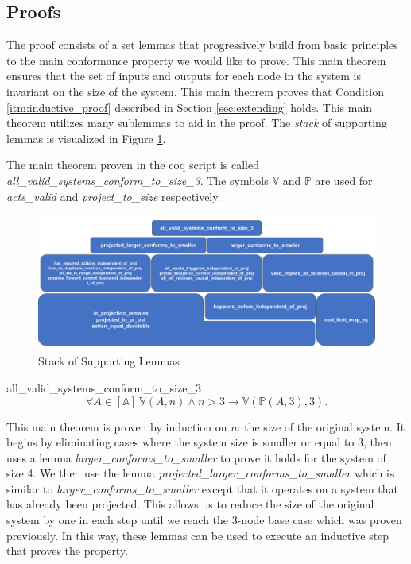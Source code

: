 \documentclass[runningheads]{llncs}
\newcommand{\action}{\mathds{A}}
\newcommand{\listaction}{[\action]}
\newcommand{\actsvalid}[2]{\mathds{V}(#1, #2)}
\newcommand{\projectsize}[2]{\mathds{P}(#1, #2)}
\begin{document}
\subsection{Proofs}

The proof consists of a set lemmas that progressively build from basic principles to the main conformance property we would like to prove. This main theorem ensures that the set of inputs and outputs for each node in the system is invariant on the size of the system. 
This main theorem proves that Condition \ref{itm:inductive_proof} described in Section \ref{sec:extending} holds. This main theorem utilizes many sublemmas to aid in the proof.
The \emph{stack} of supporting lemmas is visualized in Figure \ref{fig:coqLemmaStack}.


The main theorem proven in the coq script is called \sloppy \emph{all\_valid\_systems\_conform\_to\_size\_3}. 
The symbols $\mathds{V}$ and $\mathds{P}$ are used for \emph{acts\_valid} and \emph{project\_to\_size} respectively. 

\begin{figure}[h]
    \centering
    \includegraphics[scale=0.35]{CoqLemmaStack.png}
    \caption{Stack of Supporting Lemmas}
    \label{fig:coqLemmaStack}
\end{figure}

\begin{theorem}{all\_valid\_systems\_conform\_to\_size\_3}
\label{thm:main_conf}
$$\forall A \in \listaction\ \actsvalid{A}{n} \wedge n > 3 \longrightarrow \actsvalid{\projectsize{A}{3}}{3}.$$
\end{theorem}
This main theorem is proven by induction on $n$: the size of the original system. It begins by eliminating cases where the system size is smaller or equal to 3, then uses a lemma \emph{larger\_conforms\_to\_smaller} to prove it holds for the system of size 4. We then use the lemma \emph{projected\_larger\_conforms\_to\_smaller} which is similar to \emph{larger\_conforms\_to\_smaller} except that it operates on a system that has already been projected. This allows us to reduce the size of the original system by one in each step until we reach the 3-node base case which was proven previously.  In this way, these lemmas can be used to execute an inductive step that proves the property. 
\end{document}
